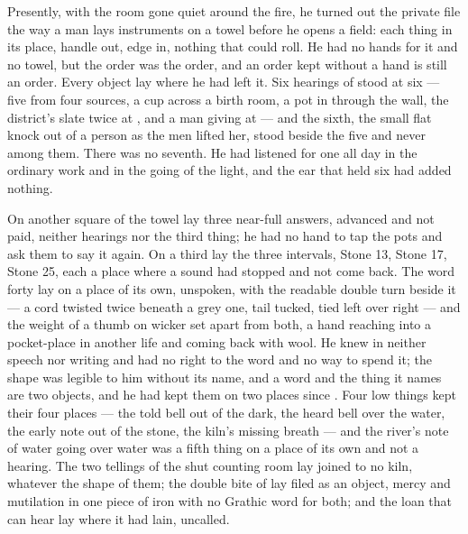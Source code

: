 Presently, with the room gone quiet around the fire, he turned out the private file the way a man lays instruments on a towel before he opens a field: each thing in its place, handle out, edge in, nothing that could roll. He had no hands for it and no towel, but the order was the order, and an order kept without a hand is still an order. Every object lay where he had left it. Six hearings of  stood at six --- five from four sources, a cup across a birth room, a pot in  through the wall, the district's slate twice at , and a man giving at  --- and the sixth, the small flat knock out of a person as the men lifted her, stood beside the five and never among them. There was no seventh. He had listened for one all day in the ordinary work and in the going of the light, and the ear that held six had added nothing.

On another square of the towel lay three near-full answers, advanced and not paid, neither hearings nor the third thing; he had no hand to tap the pots and ask them to say it again. On a third lay the three intervals, Stone 13, Stone 17, Stone 25, each a place where a sound had stopped and not come back. The word forty lay on a place of its own, unspoken, with the readable double turn beside it --- a cord twisted twice beneath a grey one, tail tucked, tied left over right --- and the weight of a thumb on wicker set apart from both, a hand reaching into a pocket-place in another life and coming back with wool. He knew  in neither speech nor writing and had no right to the word and no way to spend it; the shape was legible to him without its name, and a word and the thing it names are two objects, and he had kept them on two places since . Four low things kept their four places --- the told bell out of the dark, the heard bell over the water, the early note out of the stone, the kiln's missing breath --- and the river's note of water going over water was a fifth thing on a place of its own and not a hearing. The two tellings of the shut counting room lay joined to no kiln, whatever the shape of them; the double bite of  lay filed as an object, mercy and mutilation in one piece of iron with no Grathic word for both; and the loan that can hear lay where it had lain, uncalled.

